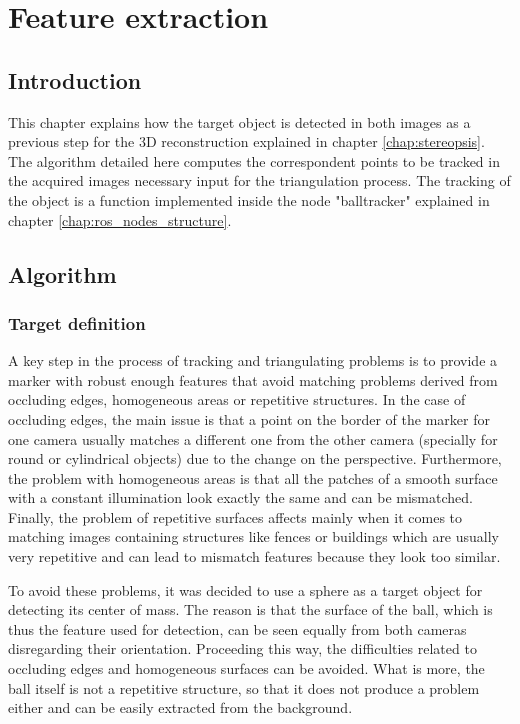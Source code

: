 \chapter{Feature extraction} %
\label{chap:feature_extraction}
\section{Introduction}
This chapter explains how the target object is detected in both images as a previous step for the 3D reconstruction explained in chapter \ref{chap:stereopsis}. The algorithm detailed here computes the correspondent points to be tracked in the acquired images necessary input for the triangulation process.
The tracking of the object is a function implemented inside the node "balltracker" explained in chapter \ref{chap:ros_nodes_structure}.

\section{Algorithm}

\subsection{Target definition}
A key step in the process of tracking and triangulating problems is to provide a marker with robust enough features that avoid matching problems derived from occluding edges, homogeneous areas or repetitive structures.
In the case of occluding edges, the main issue is that a point on the border of the marker for one camera usually matches a different one from the other camera (specially for round or cylindrical objects) due to the change on the perspective.
Furthermore, the problem with homogeneous areas is that all the patches of a smooth surface with a constant illumination look exactly the same and can be mismatched.
Finally, the problem of repetitive surfaces affects mainly when it comes to matching images containing structures like fences or buildings which are usually very repetitive and can lead to mismatch features because they look too similar.

To avoid these problems, it was decided to use a sphere as a target object for detecting its center of mass.
The reason is that the surface of the ball, which is thus the feature used for detection, can be seen equally from both cameras disregarding their orientation.
Proceeding this way, the difficulties related to occluding edges and homogeneous surfaces can be avoided.
What is more, the ball itself is not a repetitive structure, so that it does not produce a problem either and can be easily extracted from the background.

